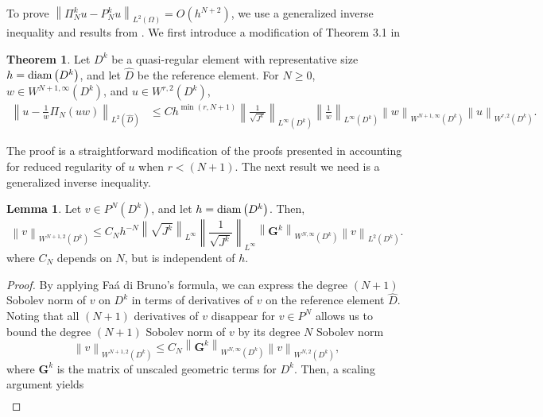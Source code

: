 \documentclass[preprint,10pt]{article}
\theoremstyle{definition}
\theoremstyle{lemma}
\newtheorem{lemma}{Lemma}
\theoremstyle{theorem}
\newtheorem{theorem}{Theorem}
\theoremstyle{assumption}
\renewcommand{\hat}{\widehat}
\newcommand{\nor}[1]{\left\| #1 \right\|}
\newcommand{\LRp}[1]{\left( #1 \right)}
\begin{document}
{To prove $\nor{\Pi_N^k u - P_N^k  u}_{L^2\LRp{\Omega}} = O(h^{N+2})$, we use a generalized inverse inequality and results from \cite{chan2016weight1,chan2016weight2}.  We first introduce a modification of Theorem 3.1 in \cite{warburton2013low, chan2016weight1}
\begin{theorem}%
Let $D^k$ be a quasi-regular element with representative size $h = {\rm diam}\LRp{D^k}$, and let $\hat{D}$ be the reference element.  For $N \geq 0$, $w\in W^{N+1,\infty}\LRp{D^k}$, and $u\in W^{r,2}\LRp{D^k}$, 
\begin{align*}
\nor{u - \frac{1}{w} \Pi_N\LRp{{u}{w}}}_{L^2\LRp{\hat{D}}} &\leq C h^{\min\LRp{r,N+1}} \nor{\frac{1}{\sqrt{J^k}}}_{L^{\infty}\LRp{D^k}}\nor{\frac{1}{w}}_{L^{\infty}\LRp{D^k}} \nor{w}_{W^{N+1,\infty}\LRp{D^k}} \nor{u}_{W^{r,2}\LRp{D^k}}.
\end{align*}
\label{thm:wproj}
\end{theorem}
The proof is a straightforward modification of the proofs presented in \cite{warburton2013low, chan2016weight1} accounting for reduced regularity of $u$ when $r < (N+1)$.  The next result we need is a generalized inverse inequality.  
\begin{lemma}
\label{lemma:sobolev}
Let $v \in P^N\LRp{D^k}$, and let $h = {\rm diam}\LRp{D^k}$.  Then,
\[
\nor{v}_{W^{N+1,2}\LRp{D^k}} \leq C_{N}  h^{-N} \nor{\sqrt{J^k}}_{L^{\infty}} \nor{\frac{1}{\sqrt{J^k}}}_{L^{\infty}} \nor{\bm{G}^k}_{W^{N,\infty}\LRp{D^k}} \nor{v}_{L^2\LRp{D^k}}.
\]
where $C_{N}$ depends on $N$, but is independent of $h$.
\end{lemma}
\begin{proof}
By applying Fa\'{a} di Bruno's formula, we can express the degree $(N+1)$ Sobolev norm of $v$ on $D^k$ in terms of derivatives of $v$ on the reference element $\hat{D}$.  Noting that all $(N+1)$ derivatives of $v$ disappear for $v\in P^N$ allows us to bound the degree $(N+1)$ Sobolev norm of $v$ by its degree $N$ Sobolev norm
\[
\nor{v}_{W^{N+1,2}\LRp{D^k}} \leq C_N \nor{\bm{G}^k}_{W^{N,\infty}\LRp{D^k}} \nor{v}_{W^{N,2}\LRp{D^k}},
\]
where $\bm{G}^k$ is the matrix of unscaled geometric terms for $D^k$.  Then, a scaling argument \cite{brenner2007mathematical} yields
\begin{align}

\end{align}
\end{proof}}
\end{document}
